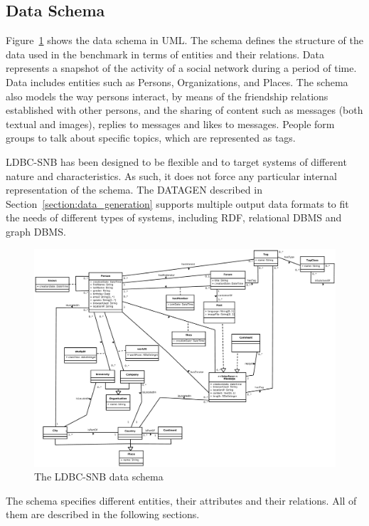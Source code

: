 \subsection{Data Schema}

Figure~\ref{figure:schema} shows the data schema in UML. The schema defines the
structure of the data used in the benchmark in terms of entities and their
relations. Data represents a snapshot of the activity of a social network
during a period of time. Data includes entities such as Persons, Organizations,
and Places. The schema also models the way persons interact, by means of the
friendship relations established with other persons, and the sharing of content
such as messages (both textual and images), replies to messages and likes to
messages.  People form groups to talk about specific topics, which are
represented as tags.

LDBC-SNB has been designed to be flexible and to target systems of different
nature and characteristics. As such, it does not force any particular internal
representation of the schema. The DATAGEN described in
Section~\ref{section:data_generation} supports multiple output data formats to
fit the needs of different types of systems, including RDF, relational DBMS and
graph DBMS.

\begin{landscape}
    \begin{figure}
        \centering
        \includegraphics[width=0.9\linewidth]{figures/schema/schema.pdf}
        \caption{The LDBC-SNB data schema}
        \label{figure:schema}
    \end{figure}
\end{landscape}

The schema specifies different entities, their attributes and their relations.
All of them are described in the following sections.

